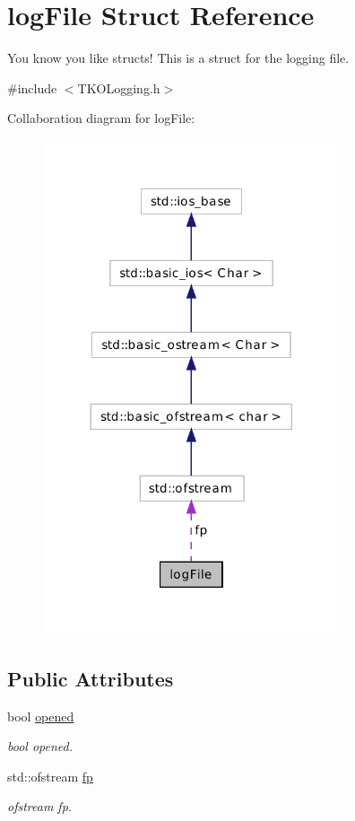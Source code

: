 \hypertarget{structlog_file}{\section{log\-File Struct Reference}
\label{structlog_file}
}


You know you like structs! This is a struct for the logging file.  




{\ttfamily \#include $<$T\-K\-O\-Logging.\-h$>$}



Collaboration diagram for log\-File\-:\nopagebreak
\begin{figure}[H]
\begin{center}
\leavevmode
\includegraphics[width=248pt]{structlog_file__coll__graph}
\end{center}
\end{figure}
\subsection*{Public Attributes}
\begin{DoxyCompactItemize}
\item 
bool \hyperlink{structlog_file_a4a069d00b4f684751ecba0c9625eeae6}{opened}
\begin{DoxyCompactList}\small\item\em bool opened. \end{DoxyCompactList}\item 
std\-::ofstream \hyperlink{structlog_file_a78d1ffa2264f3fcb04177e06803a9426}{fp}
\begin{DoxyCompactList}\small\item\em ofstream fp. \end{DoxyCompactList}\end{DoxyCompactItemize}



